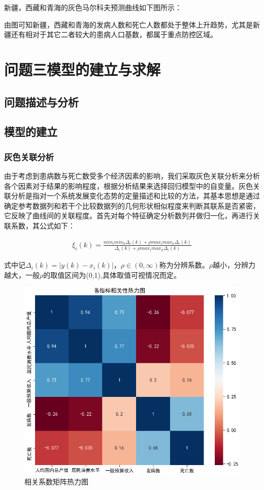 \documentclass{whutmod}
\begin{document}
 
    新疆，西藏和青海的灰色马尔科夫预测曲线如下图所示：
    
    由图可知新疆，西藏和青海的发病人数和死亡人数都处于整体上升趋势，尤其是新疆还有相对于其它二者较大的患病人口基数，都属于重点防控区域。

     	\section{问题三模型的建立与求解}
     \subsection{问题描述与分析}
    
     
     
     \subsection{模型的建立}
     	\subsubsection{灰色关联分析}
     由于考虑到患病数与死亡数受多个经济因素的影响，我们采取灰色关联分析来分析各个因素对于结果的影响程度，根据分析结果来选择回归模型中的自变量。灰色关联分析是指对一个系统发展变化态势的定量描述和比较的方法，其基本思想是通过确定参考数据列和若干个比较数据列的几何形状相似程度来判断其联系是否紧密，它反映了曲线间的关联程度。首先对每个特征确定分析数列并做归一化，再进行关联系数，其公式如下：
     
     \begin{gather}
     \xi _{i}\left ( k \right )=\frac{min_{i} min_{k}\Delta _{i}(k)+\rho max_{i} max_{k}\Delta _{i}(k)}{\Delta _{i}(k)+\rho max_{i} max_{k}\Delta _{i}(k)}
     \end{gather}
     
     
     式中记$\Delta _{i}(k)=|y(k)-x_{i}(k)|$，$\rho \in (0,\infty )$称为分辨系数。$\rho $越小，分辨力越大，一般$\rho $的取值区间为(0,1),具体取值可视情况而定。
 \begin{figure}[H]
 	\centering
 	\includegraphics[width=.7\textwidth]{figures/Figure_8.png}
 	\caption{相关系数矩阵热力图}\label{re}
 \end{figure}
     	
\end{document}
